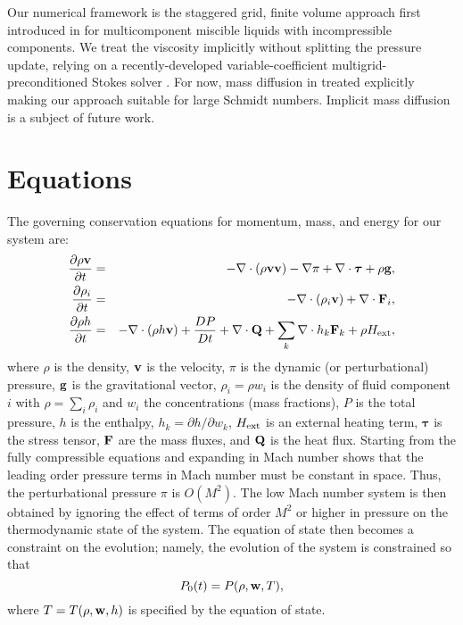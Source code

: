 \documentclass[final]{siamltex}
\def\Fb {{\bf F}}
\def\gb {{\bf g}}
\def\Qb {{\bf Q}}
\def\vb {{\bf v}}
\def\wb {{\bf w}}
\def\taub   {\boldsymbol{\tau}}
\def\Hext {H_{\rm ext}}
\begin{document}
Our numerical framework is the staggered grid, finite volume approach first
introduced in \cite{LowMachExplicit,LowMachImplicit,LowMachMulti} for
multicomponent miscible liquids with incompressible components.
We treat the viscosity implicitly without splitting the pressure
update, relying on a recently-developed variable-coefficient multigrid-preconditioned
Stokes solver \cite{StokesPreconditioners}.
For now, mass diffusion in treated explicitly making our
approach suitable for large Schmidt numbers.  Implicit mass diffusion is a subject
of future work.

\section{Equations}
The governing conservation equations for momentum, mass, and energy for our system are:
\begin{eqnarray}
\frac{\partial\rho\vb}{\partial t} &=& - \nabla\cdot(\rho\vb\vb) - \nabla\pi + \nabla\cdot\taub + \rho\gb,\label{eq:momentum}\\
\frac{\partial\rho_i}{\partial t} &=& -\nabla\cdot(\rho_i\vb) + \nabla\cdot \Fb_i,\label{eq:mass}\\
\frac{\partial\rho h}{\partial t} &=& -\nabla\cdot(\rho h\vb) + \frac{DP}{Dt} + \nabla\cdot\Qb + \sum_k \nabla\cdot h_k \Fb_k + \rho\Hext,\label{eq:enthalpy}
\end{eqnarray}
where $\rho$ is the density, $\vb$ is the velocity, $\pi$ is the dynamic 
(or perturbational) pressure, $\gb$ is the gravitational vector, $\rho_i=\rho w_i$ is
the density of fluid component $i$ with $\rho = \sum_i\rho_i$ and $w_i$ the 
concentrations (mass fractions), $P$ is the total
pressure, $h$ is the enthalpy, $h_k = \partial h/\partial w_k$,
$\Hext$ is an external heating term, $\taub$ is the stress tensor,
$\Fb$ are the mass fluxes, and $\Qb$ is the heat flux.
Starting from the fully compressible equations and expanding in Mach number shows 
that the leading order pressure terms in Mach number must be constant in space. 
Thus, the perturbational pressure $\pi$ is $O(M^2)$.
The low Mach number system is then obtained by ignoring the effect of terms of 
order $M^2$ or higher in pressure  on the thermodynamic state of the system.
The equation of state then becomes a constraint on the evolution; namely,
the evolution of the system is constrained so that
\begin{equation}
P_0(t) = P(\rho,\wb,T),\label{eq:EOS}
\end{equation}
where $T=T(\rho,\wb,h)$ is specified by the equation of state.\\
\end{document}
